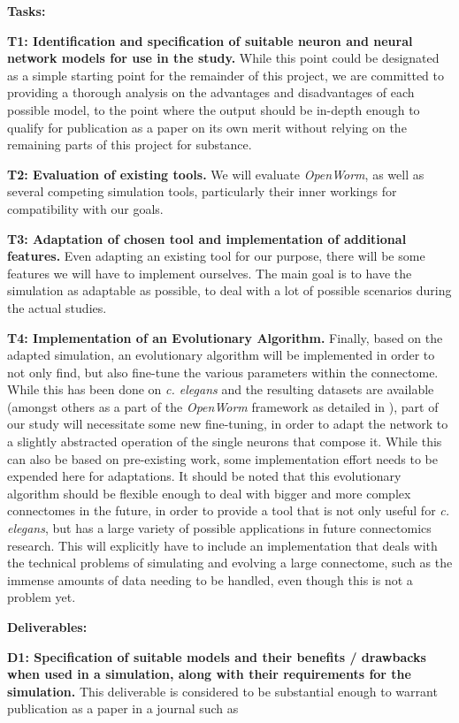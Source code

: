 \documentclass[a4paper,11pt]{article}
\begin{document}
\textbf{Tasks:}

\textbf{T1: Identification and specification of suitable neuron and neural network models for use in the study.}
While this point could be designated as a simple starting point for the remainder of this project, we are committed to providing a thorough analysis on the advantages and disadvantages of each possible model, to the point where the output should be in-depth enough to qualify for publication as a paper on its own merit without relying on the remaining parts of this project for substance.

\textbf{T2: Evaluation of existing tools.}
We will evaluate \emph{OpenWorm}, as well as several competing simulation tools, particularly their inner workings for compatibility with our goals.

\textbf{T3: Adaptation of chosen tool and implementation of additional features.}
Even adapting an existing tool for our purpose, there will be some features we will have to implement ourselves. The main goal is to have the simulation as adaptable as possible, to deal with a lot of possible scenarios during the actual studies. 

\textbf{T4: Implementation of an Evolutionary Algorithm.}
Finally, based on the adapted simulation, an evolutionary algorithm will be implemented in order to not only find, but also fine-tune the various parameters within the connectome. While this has been done on \emph{c. elegans} and the resulting datasets are available (amongst others as a part of the \emph{OpenWorm} framework as detailed in \citep{Szigeti2014}), part of our study will necessitate some new fine-tuning, in order to adapt the network to a slightly abstracted operation of the single neurons that compose it. While this can also be based on pre-existing work, some implementation effort needs to be expended here for adaptations.
It should be noted that this evolutionary algorithm should be flexible enough to deal with bigger and more complex connectomes in the future, in order to provide a tool that is not only useful for \emph{c. elegans}, but has a large variety of possible applications in future connectomics research. This will explicitly have to include an implementation that deals with the technical problems of simulating and evolving a large connectome, such as the immense amounts of data needing to be handled, even though this is not a problem yet.

\textbf{Deliverables:}

\textbf{D1: Specification of suitable models and their benefits / drawbacks when used in a simulation, along with their requirements for the simulation.} This deliverable is considered to be substantial enough to warrant publication as a paper in a journal such as 
\end{document}
